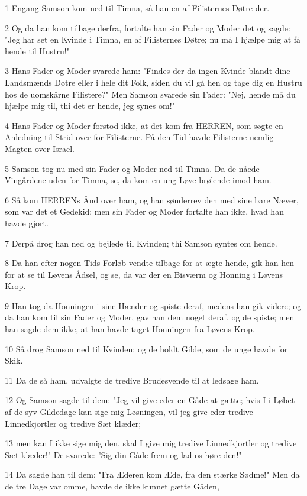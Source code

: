 \par 1 Engang Samson kom ned til Timna, så han en af Filisternes Døtre der.
\par 2 Og da han kom tilbage derfra, fortalte han sin Fader og Moder det og sagde: "Jeg har set en Kvinde i Timna, en af Filisternes Døtre; nu må I hjælpe mig at få hende til Hustru!"
\par 3 Hans Fader og Moder svarede ham: "Findes der da ingen Kvinde blandt dine Landsmænds Døtre eller i hele dit Folk, siden du vil gå hen og tage dig en Hustru hos de uomskårne Filistere?" Men Samson svarede sin Fader: "Nej, hende må du hjælpe mig til, thi det er hende, jeg synes om!"
\par 4 Hans Fader og Moder forstod ikke, at det kom fra HERREN, som søgte en Anledning til Strid over for Filisterne. På den Tid havde Filisterne nemlig Magten over Israel.
\par 5 Samson tog nu med sin Fader og Moder ned til Timna. Da de nåede Vingårdene uden for Timna, se, da kom en ung Løve brølende imod ham.
\par 6 Så kom HERRENs Ånd over ham, og han sønderrev den med sine bare Næver, som var det et Gedekid; men sin Fader og Moder fortalte han ikke, hvad han havde gjort.
\par 7 Derpå drog han ned og bejlede til Kvinden; thi Samson syntes om hende.
\par 8 Da han efter nogen Tids Forløb vendte tilbage for at ægte hende, gik han hen for at se til Løvens Ådsel, og se, da var der en Bisværm og Honning i Løvens Krop.
\par 9 Han tog da Honningen i sine Hænder og spiste deraf, medens han gik videre; og da han kom til sin Fader og Moder, gav han dem noget deraf, og de spiste; men han sagde dem ikke, at han havde taget Honningen fra Løvens Krop.
\par 10 Så drog Samson ned til Kvinden; og de holdt Gilde, som de unge havde for Skik.
\par 11 Da de så ham, udvalgte de tredive Brudesvende til at ledsage ham.
\par 12 Og Samson sagde til dem: "Jeg vil give eder en Gåde at gætte; hvis I i Løbet af de syv Gildedage kan sige mig Løsningen, vil jeg give eder tredive Linnedkjortler og tredive Sæt klæder;
\par 13 men kan I ikke sige mig den, skal I give mig tredive Linnedkjortler og tredive Sæt klæder!" De svarede: "Sig din Gåde frem og lad os høre den!"
\par 14 Da sagde han til dem: "Fra Æderen kom Æde, fra den stærke Sødme!" Men da de tre Dage var omme, havde de ikke kunnet gætte Gåden,
